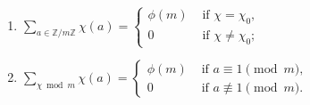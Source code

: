 \begin{theorem}\leavevmode
    \label{thm:orthogonality_rel}
    \begin{enumerate}[label={\upshape\roman*)}]
        \item $\displaystyle\sum_{a \in \mathbb{Z} / m \mathbb{Z}} \chi(a) = \begin{cases}
                \phi(m)  &\text{ if } \chi= \chi_0,\\
                0 &\text{ if } \chi \neq \chi_0;
            \end{cases}$
        \item\label{item:orthogonality_rel_item:ii} $\displaystyle\sum_{\chi \bmod m} \chi(a) = \begin{cases}
                \phi(m) &\text{ if } a \equiv 1 \pmod m, \\
                0 &\text{ if } a \not\equiv 1 \pmod m.
            \end{cases}$
    \end{enumerate}
\end{theorem}

